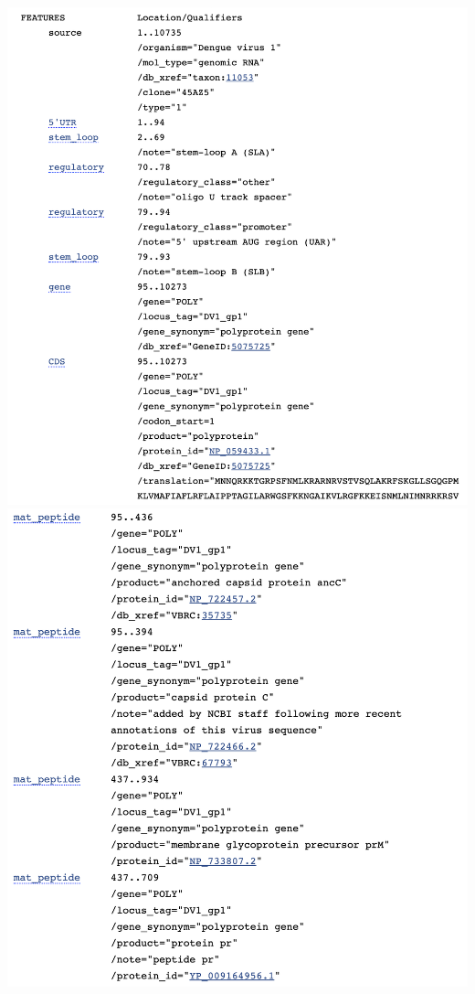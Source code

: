 \documentclass[landscape]{slides}
\begin{document}
\begin{slide}
\begin{center}

\includegraphics[width=6in]{figs/ss-001477-mid}
\includegraphics[width=6in]{figs/ss-001477-bot}

\end{center}
\end{slide}
\end{document}
